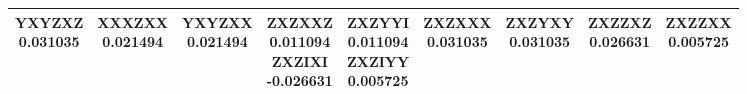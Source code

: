 \documentclass[twocolumn]{revtex4-1}
\newcommand{\1}{\mathbbm{1}}
\begin{document}
\begin{longtable}{|c|c|c|c|c|c|c|c|c|}
\parbox{1.9cm}{\centering\vspace{.5\baselineskip}
YXYZXZ\\
0.031035\\ 
\vspace{.5\baselineskip}}
&
\parbox{1.9cm}{\centering\vspace{.5\baselineskip}
XXXZXX\\
0.021494\\ 
\vspace{.5\baselineskip}}
&
\parbox{1.9cm}{\centering\vspace{.5\baselineskip}
YXYZXX\\
0.021494\\ 
\vspace{.5\baselineskip}}
&
\parbox{1.9cm}{\centering\vspace{.5\baselineskip}
ZXZXXZ\\
0.011094\\ 
ZXZIXI\\
-0.026631\\ 
\vspace{.5\baselineskip}}
&
\parbox{1.9cm}{\centering\vspace{.5\baselineskip}
ZXZYYI\\
0.011094\\ 
ZXZIYY\\
0.005725\\ 
\vspace{.5\baselineskip}}
&
\parbox{1.9cm}{\centering\vspace{.5\baselineskip}
ZXZXXX\\
0.031035\\ 
\vspace{.5\baselineskip}}
&
\parbox{1.9cm}{\centering\vspace{.5\baselineskip}
ZXZYXY\\
0.031035\\ 
\vspace{.5\baselineskip}}
&
\parbox{1.9cm}{\centering\vspace{.5\baselineskip}
ZXZZXZ\\
0.026631\\ 
\vspace{.5\baselineskip}}
&
\parbox{1.9cm}{\centering\vspace{.5\baselineskip}
ZXZZXX\\
0.005725\\ 
\vspace{.5\baselineskip}}\\		
\hline						%

\end{longtable}
\end{document}
